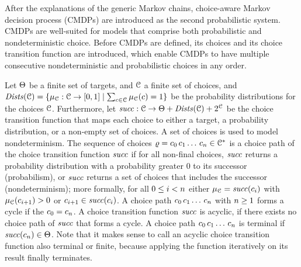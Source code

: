 After the explanations of the generic Markov chains, choice-aware Markov decision process (CMDPs) are introduced as the second probabilistic system.
CMDPs are well-suited for models that comprise both probabilistic and nondeterministic choice.
Before CMDPs are defined, its choices and its choice transition function are introduced, which enable CMDPs to have multiple consecutive nondeterministic and probabilistic choices in any order.

Let $\Targets$ be a finite set of targets, and
$\Choices$ a finite set of choices, and
$\Dists(\Choices) = \{ \dist_{\Choices} : \Choices \to \ProbRange \mid \sum_{\cmdpChoice \in \Choices} \dist_{\Choices}(\cmdpChoice) = 1 \}$ be the probability distributions for the choices $\Choices$.
Furthermore, let $\choiceTrans : \Choices \rightarrow \Targets + \Dists(\Choices) + 2^{\Choices}$ be the choice transition function that maps each choice to either a target, a probability distribution, or a non-empty set of choices.
A set of choices is used to model nondeterminism.
The sequence of choices $\cpath = \cmdpChoice_0\,\cmdpChoice_1\dotspath\,\cmdpChoice_n \in \Choices^*$ is a choice path of the choice transition function $\choiceTrans$ if for all non-final choices,
$\choiceTrans$ returns a probability distribution with a probability greater 0 to its successor (probabilism),
or $\choiceTrans$ returns a set of choices that includes the successor (nondeterminism);
more formally,
for all $\natrangeex{i}{0}{n}$ either $\dist_{\Choices}=\choiceTrans(\cmdpChoice_{i})$ with $\dist_{\Choices}(\cmdpChoice_{i+1})>0$ or $\cmdpChoice_{i+1}\in\choiceTrans(\cmdpChoice_{i})$.
A choice path $\cmdpChoice_0\,\cmdpChoice_1\dotspath\,\cmdpChoice_n$ with $\intabove{n}{1}$ forms a cycle if the $\cmdpChoice_0=\cmdpChoice_n$.
A choice transition function $\choiceTrans$ is acyclic, if there exists no choice path of $\choiceTrans$ that forms a cycle.
A choice path $\cmdpChoice_0\,\cmdpChoice_1\dotspath\,\cmdpChoice_n$ is terminal if $\choiceTrans(\cmdpChoice_n)\in\Targets$.
Note that it makes sense to call an acyclic choice transition function also terminal or finite, because applying the function iteratively on its result finally terminates.


